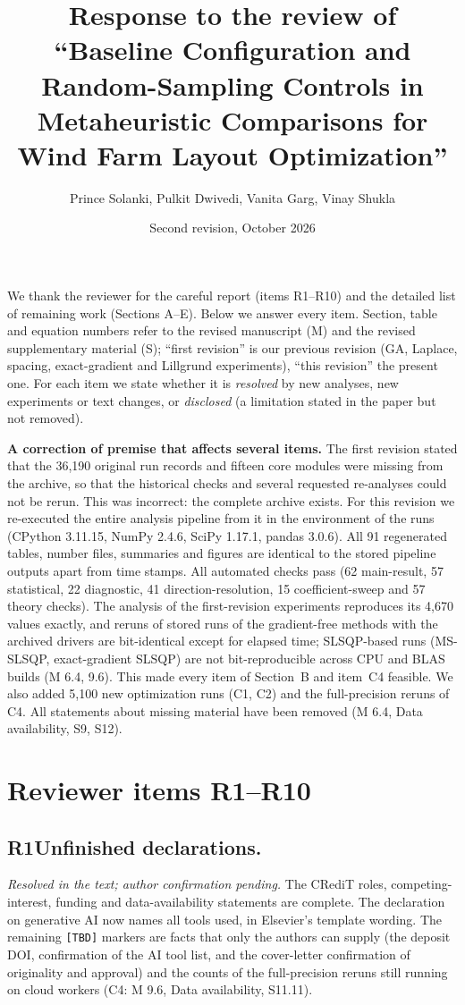 \documentclass[11pt,a4paper]{article}
\title{Response to the review of\\ ``Baseline Configuration and Random-Sampling Controls in Metaheuristic Comparisons for Wind Farm Layout Optimization''}
\author{Prince Solanki, Pulkit Dwivedi, Vanita Garg, Vinay Shukla}
\date{Second revision, October 2026}
\newcommand{\concern}[2]{\subsection*{#1\quad #2}}
\begin{document}
\maketitle

We thank the reviewer for the careful report (items R1--R10) and the detailed list of remaining work (Sections A--E).
Below we answer every item. Section, table and equation numbers refer to the revised manuscript (M) and the
revised supplementary material (S); ``first revision'' is our previous revision (GA, Laplace, spacing, exact-gradient and Lillgrund experiments), ``this revision'' the present one. For each item we state whether it is \emph{resolved} by new analyses, new
experiments or text changes, or \emph{disclosed} (a limitation stated in the paper but not removed).

\textbf{A correction of premise that affects several items.} The first revision stated that the 36,190 original run
records and fifteen core modules were missing from the archive, so that the historical checks and several requested
re-analyses could not be rerun. This was incorrect: the complete archive exists. For this revision we re-executed the
entire analysis pipeline from it in the environment of the runs (CPython 3.11.15, NumPy 2.4.6, SciPy 1.17.1, pandas
3.0.6). All 91 regenerated tables, number files, summaries and figures are identical to the stored pipeline outputs apart
from time stamps. All automated checks pass (62 main-result, 57 statistical, 22 diagnostic, 41 direction-resolution,
15 coefficient-sweep and 57 theory checks). The analysis of the first-revision experiments reproduces its 4,670
values exactly, and reruns of stored runs of the gradient-free methods with the archived drivers are bit-identical
except for elapsed time; SLSQP-based runs (MS-SLSQP, exact-gradient SLSQP) are not bit-reproducible across CPU and
BLAS builds (M 6.4, 9.6). This
made every item of Section~B and item~C4 feasible. We also added 5,100 new optimization runs (C1, C2) and the
full-precision reruns of C4. All statements about missing material have been removed (M 6.4, Data availability,
S9, S12).

\section*{Reviewer items R1--R10}

\concern{R1}{Unfinished declarations.}
\emph{Resolved in the text; author confirmation pending.} The CRediT roles, competing-interest, funding and
data-availability statements are complete. The declaration on generative AI now names all tools used, in Elsevier's
template wording. The remaining \texttt{[TBD]} markers are facts that only the authors can supply (the
deposit DOI, confirmation of the AI tool list, and the cover-letter confirmation of originality and approval) and
the counts of the full-precision reruns still running on cloud workers (C4: M 9.6, Data availability, S11.11).
\end{document}
